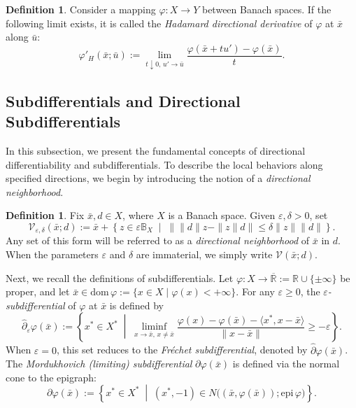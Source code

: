 \documentclass[12pt,twoside,reqno]{amsart}
\theoremstyle{definition}
\newtheorem{definition}[theorem]{Definition}
\numberwithin{equation}{section}
\begin{document}
\begin{definition}\label{defn:hadamard_derivative}
Consider a mapping \(\varphi:X\to Y\) between Banach spaces. If the
following limit exists, it is called the \emph{Hadamard directional
derivative} of \(\varphi\) at \(\bar{x}\) along \(\bar{u}\):
\[
    \varphi'_H(\bar{x};\bar{u})
    :=\lim_{t\downarrow0,\,u'\to\bar{u}}
    \frac{\varphi(\bar{x}+tu')-\varphi(\bar{x})}{t}.
\]
\end{definition}

\subsection{Subdifferentials and Directional Subdifferentials}

In this subsection, we present the fundamental concepts of directional differentiability and subdifferentials. To describe the local behaviors along specified directions, we begin by introducing the notion of a \emph{directional neighborhood}.

\begin{definition}\label{defn:directional_neighborhood}
Fix $\bar{x},d\in X$, where $X$ is a Banach space. Given $\varepsilon,\delta>0$, set
\begin{equation*}
    \mathcal{V}_{\varepsilon,\delta}(\bar{x}; d) := \bar{x} + \left\{ z \in \varepsilon \mathbb{B}_X \;\middle|\; \big\| \|d\|z - \|z\|d \big\| \leq \delta \|z\| \|d\| \right\}.
\end{equation*}
Any set of this form will be referred to as a \emph{directional neighborhood} of $\bar{x}$ in $d$. When the parameters $\varepsilon$ and $\delta$ are immaterial, we simply write $\mathcal{V}(\bar{x}; d)$.
\end{definition}

Next, we recall the definitions of subdifferentials. Let $\varphi: X \to \overline{\mathbb{R}}:=\mathbb{R}\cup\{\pm\infty\}$ be proper, and let $\bar{x} \in \mathrm{dom}\, \varphi := \{x \in X \mid \varphi(x) < +\infty\}$. For any $\varepsilon \ge 0$, the \emph{$\varepsilon$-subdifferential} of $\varphi$ at $\bar{x}$ is defined by
\begin{equation*}
    \widehat{\partial}_{\varepsilon}\varphi(\bar{x}) := \left\{ x^* \in X^* \;\middle|\; \liminf_{x \to \bar{x}, \, x \neq \bar{x}} \frac{\varphi(x) - \varphi(\bar{x}) - \langle x^*, x - \bar{x} \rangle}{\|x - \bar{x}\|} \geq -\varepsilon \right\}.
\end{equation*}
When $\varepsilon = 0$, this set reduces to the \emph{Fr\'echet subdifferential}, denoted by $\widehat{\partial}\varphi(\bar{x})$. The \emph{Mordukhovich (limiting) subdifferential} $\partial \varphi(\bar{x})$ is defined via the normal cone to the epigraph:
\begin{equation*}
    \partial \varphi(\bar{x}) := \left\{ x^* \in X^* \;\middle|\; (x^*, -1) \in N\big((\bar{x}, \varphi(\bar{x})); \mathrm{epi}\, \varphi\big) \right\}. 
\end{equation*}
\end{document}
